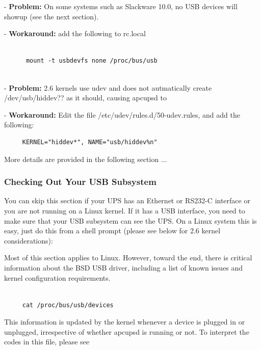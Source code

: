 - {\bf Problem:} On some systems such as Slackware 10.0, no USB devices will
showup (see the next section).  

- {\bf Workaround:} add the following to rc.local 

\footnotesize
\begin{verbatim}
     
      mount -t usbdevfs none /proc/bus/usb
     
\end{verbatim}
\normalsize

- {\bf Problem:} 2.6 kernels use udev and does not autmatically create
/dev/usb/hiddev?? as it should, causing apcupsd to  

- {\bf Workaround:} Edit the file /etc/udev/rules.d/50-udev.rules, and add the
following: 

\footnotesize
\begin{verbatim}
     KERNEL="hiddev*", NAME="usb/hiddev%n"
\end{verbatim}
\normalsize

More details are provided in the following section ... 

\label{Checking-Out-Your-USB-Subsystem}

\subsubsection*{Checking Out Your USB Subsystem}

You can skip this section if your UPS has an Ethernet or RS232-C interface or
you are not running on a Linux kernel.  If it has a USB interface, you need to
make sure that your USB subsystem can see the UPS. On a Linux system this is
easy, just do this from a shell prompt (please see below for 2.6 kernel
considerations):  

Most of this section applies to Linux. However, toward the end, there is
critical information about the BSD USB driver, including a list of known
issues and kernel configuration requirements. 

\footnotesize
\begin{verbatim}
     
     cat /proc/bus/usb/devices
\end{verbatim}
\normalsize

This information is updated by the kernel whenever a device is plugged in or
unplugged, irrespective of whether apcupsd is running or not. To interpret the
codes in this file, please see 

